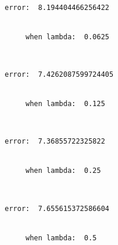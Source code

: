 \documentclass[11pt]{article}
\begin{document}
    \begin{Verbatim}[commandchars=\\\{\}]
     error:  8.194404466256422


     when lambda:  0.0625

    \end{Verbatim}

    \begin{center}
    \end{center}
    { \hspace*{\fill} \\}
    
    \begin{Verbatim}[commandchars=\\\{\}]
     error:  7.4262087599724405


     when lambda:  0.125

    \end{Verbatim}

    \begin{center}
    \end{center}
    { \hspace*{\fill} \\}
    
    \begin{Verbatim}[commandchars=\\\{\}]
     error:  7.36855722325822


     when lambda:  0.25

    \end{Verbatim}

    \begin{center}
    \end{center}
    { \hspace*{\fill} \\}
    
    \begin{Verbatim}[commandchars=\\\{\}]
     error:  7.655615372586604


     when lambda:  0.5

    \end{Verbatim}

    \begin{center}
    \end{center}
    { \hspace*{\fill} \\}
    
\end{document}
